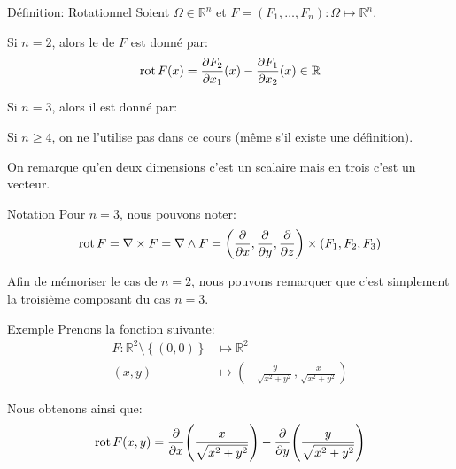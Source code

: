 \documentclass[a4paper]{article}
\begin{document}
\begin{parag}{Définition: Rotationnel}
    Soient $\Omega \in \mathbb{R}^n$ et $F = \left(F_1, \ldots, F_n\right) : \Omega \mapsto \mathbb{R}^n$.

    Si $n = 2$, alors le  de $F$ est donné par: 
    \[\rot F\left(x\right) = \frac{\partial F_2}{\partial x_1} \left(x\right) - \frac{\partial F_1}{\partial x_2} \left(x\right) \in \mathbb{R}\]
    
    Si $n = 3$, alors il est donné par: 
    
    Si $n \geq 4$, on ne l'utilise pas dans ce cours (même s'il existe une définition).

    On remarque qu'en deux dimensions c'est un scalaire mais en trois c'est un vecteur.

    \begin{subparag}{Notation}
        Pour $n = 3$, nous pouvons noter: 
        \[\rot F = \nabla \times F = \nabla \wedge F = \left(\frac{\partial }{\partial x}, \frac{\partial }{\partial y} , \frac{\partial }{\partial z} \right)\times \left(F_1, F_2, F_3\right)\]
        
        Afin de mémoriser le cas de $n = 2$, nous pouvons remarquer que c'est simplement la troisième composant du cas $n = 3$.
    \end{subparag}
    
    \begin{subparag}{Exemple}
        Prenons la fonction suivante: 
        \[\begin{split}
        F: \mathbb{R}^2 \setminus \left\{\left(0, 0\right)\right\} &\longmapsto \mathbb{R}^2 \\
        \left(x, y\right) &\longmapsto \left(-\frac{y}{\sqrt{x^2 + y^2}}, \frac{x}{\sqrt{x^2 + y^2}}\right)
        \end{split}\]
        
        Nous obtenons ainsi que: 
        \[\rot F\left(x, y\right) = \frac{\partial }{\partial x} \left(\frac{x}{\sqrt{x^2 + y^2}}\right) - \frac{\partial }{\partial y} \left(\frac{y}{\sqrt{x^2 + y^2}}\right)\]
        

\end{subparag}
\end{parag}
\end{document}
